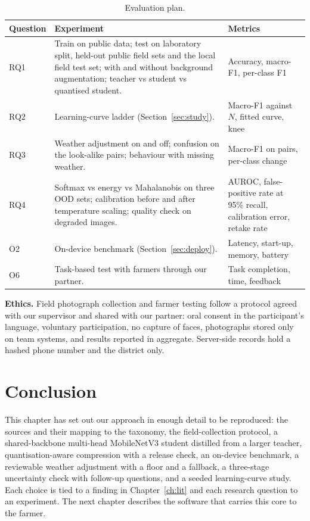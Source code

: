 \begin{table}[H]
\centering\small
\caption{Evaluation plan.}
\label{tab:evalplan}
\begin{tabularx}{\textwidth}{|L{1.4cm}|Y|L{3.6cm}|}
\hline
\textbf{Question} & \textbf{Experiment} & \textbf{Metrics} \\ \hline
RQ1 & Train on public data; test on laboratory split, held-out public field sets and the local field test set; with and without background augmentation; teacher vs student vs quantised student. & Accuracy, macro-F1, per-class F1 \\ \hline
RQ2 & Learning-curve ladder (Section~\ref{sec:study}). & Macro-F1 against $N$, fitted curve, knee \\ \hline
RQ3 & Weather adjustment on and off; confusion on the look-alike pairs; behaviour with missing weather. & Macro-F1 on pairs, per-class change \\ \hline
RQ4 & Softmax vs energy vs Mahalanobis on three OOD sets; calibration before and after temperature scaling; quality check on degraded images. & AUROC, false-positive rate at 95\% recall, calibration error, retake rate \\ \hline
O2 & On-device benchmark (Section~\ref{sec:deploy}). & Latency, start-up, memory, battery \\ \hline
O6 & Task-based test with farmers through our partner. & Task completion, time, feedback \\ \hline
\end{tabularx}
\end{table}

\textbf{Ethics.} Field photograph collection and farmer testing follow a protocol agreed with our supervisor and shared with our partner: oral consent in the participant's language, voluntary participation, no capture of faces, photographs stored only on team systems, and results reported in aggregate. Server-side records hold a hashed phone number and the district only.

\section{Conclusion}
This chapter has set out our approach in enough detail to be reproduced: the sources and their mapping to the taxonomy, the field-collection protocol, a shared-backbone multi-head MobileNetV3 student distilled from a larger teacher, quantisation-aware compression with a release check, an on-device benchmark, a reviewable weather adjustment with a floor and a fallback, a three-stage uncertainty check with follow-up questions, and a seeded learning-curve study. Each choice is tied to a finding in Chapter~\ref{ch:lit} and each research question to an experiment. The next chapter describes the software that carries this core to the farmer.

